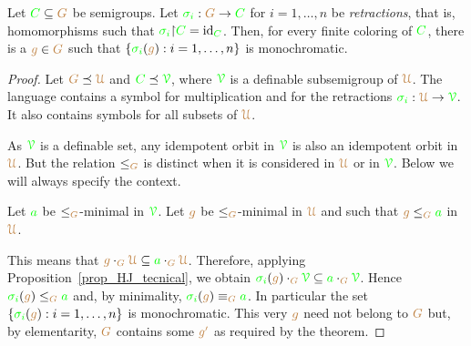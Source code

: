 \documentclass[creche.tex]{subfiles}
\begin{document}
\begin{theorem}
Let ${\gr C}\subseteq{\mr G}$ be semigroups.
Let ${\gr\sigma_i}:{\mr G}\to{\gr C}$ for $i=1,\dots,n$ be \emph{retractions}, that is,
homomorphisms such that ${\gr\sigma_i}{\restriction}{\gr C}={\rm id}_{\gr C}$.
Then, for every finite coloring of ${\gr C}$,
there is a ${\mr g}\in{\mr G}$ such that $\{{\gr\sigma_i}({\mr g}):i=1,\dots,n\}$ is monochromatic.
\end{theorem}

\begin{proof}
Let ${\mr G}\preceq\mrU$ and ${\gr C}\preceq\grV$,
where $\grV$ is a definable subsemigroup of $\mrU$.
The language contains a symbol for multiplication and for the retractions ${\gr\sigma_i}:\mrU\to\grV$.
It also contains symbols for all subsets of $\mrU$.

As $\grV$ is a definable set, any idempotent orbit in $\grV$ is also an idempotent orbit in $\mrU$.
But the relation $\le_{\mr G}$ is distinct when it is considered in $\mrU$ or in $\grV$.
Below we will always specify the context.

Let ${\gr a}$ be $\le_{\mr G}$-minimal in $\grV$.
Let ${\mr g}$ be $\le_{\mr G}$-minimal in $\mrU$
and such that ${\mr g}\le_{\mr G}{\gr a}$ in $\mrU$.

This means that ${\mr g}\cdot_{\mr G}\mrU\subseteq{\gr a}\cdot_{\mr G}\mrU$.
Therefore, applying Proposition~\ref{prop_HJ_tecnical},  we obtain
${\gr\sigma_i}({\mr g})\cdot_{\mr G}\grV\subseteq{\gr a}\cdot_{\mr G}\grV$.
Hence ${\gr\sigma_i}({\mr g})\le_{\mr G}{\gr a}$ and, by minimality, 
${\gr\sigma_i}({\mr g})\equiv_{\mr G}{\gr a}$.
In particular the set $\{{\gr\sigma_i}({\mr g}):i=1,\dots,n\}$ is monochromatic. 
This very ${\mr g}$ need not belong to ${\mr G}$ but,
by elementarity, ${\mr G}$ contains some ${\mr g'}$ as required by the theorem.
\end{proof}
\end{document}
